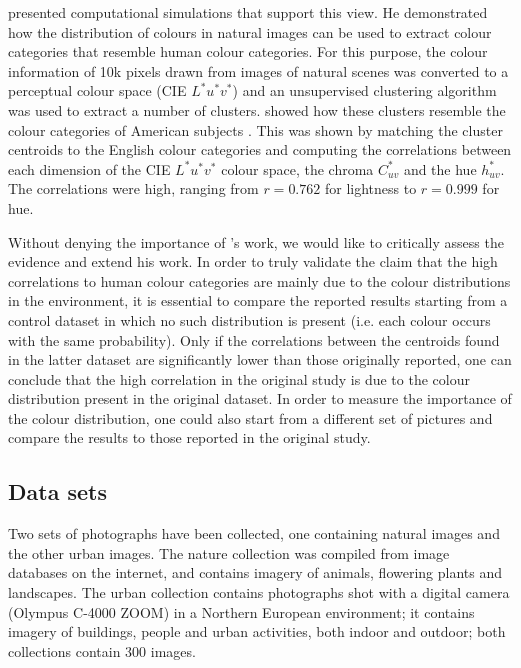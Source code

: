 \cite{yendrikhovskij01computational} presented computational
simulations that support this view. He demonstrated how the
distribution of colours in natural images can be used to extract
colour categories that resemble human colour categories. For this
purpose, the colour information of 10k pixels drawn from images of
natural scenes was converted to a perceptual colour space (CIE
$L^*u^*v^*$) and an unsupervised clustering algorithm was used to
extract a number of
clusters. \citeauthor{yendrikhovskij01computational} showed how these
clusters resemble the colour categories of American subjects
\citep{boynton87locating}. This was shown by matching the cluster
centroids to the English colour categories and computing the
correlations between each dimension of the CIE $L^*u^*v^*$ colour
space, the chroma $C^*_{uv}$ and the hue $h^*_{uv}$. The correlations
were high, ranging from $r = 0.762$ for lightness to $r = 0.999$ for
hue.

Without denying the importance of
\citeauthor{yendrikhovskij01computational}'s work, we would like to
critically assess the evidence and extend his work. In order to truly
validate the claim that the high correlations to human colour
categories are mainly due to the colour distributions in the
environment, it is essential to compare the reported results starting
from a control dataset in which no such distribution is present
(i.e. each colour occurs with the same probability). Only if the
correlations between the centroids found in the latter dataset are
significantly lower than those originally reported, one can conclude
that the high correlation in the original study is due to the colour
distribution present in the original dataset. In order to measure the
importance of the colour distribution, one could also start from a
different set of pictures and compare the results to those reported in
the original study.

\subsection{Data sets}
\label{s:simulated-data-sets}

Two sets of photographs have been collected, one containing natural
images and the other urban images. The nature collection was compiled
from image databases on the internet, and contains imagery of animals,
flowering plants and landscapes. The urban collection contains
photographs shot with a digital camera (Olympus C-4000 ZOOM) in a
Northern European environment; it contains imagery of buildings,
people and urban activities, both indoor and outdoor; both collections
contain 300 images.

